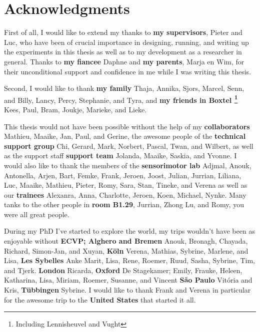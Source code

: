 \clearpage
\pagestyle{empty}

\chapter*{Acknowledgments}
{}

First of all, I would like to extend my thanks to \textbf{my supervisors}, Pieter and Luc, who have been of crucial importance in designing, running, and writing up the experiments in this thesis as well as to my development as a researcher in general. Thanks to \textbf{my fiancee} Daphne and \textbf{my parents}, Marja en Wim, for their unconditional support and confidence in me while I was writing this thesis.

Second, I would like to thank \textbf{my family} Thaja, Annika, Sjors, Marcel, Senn, and Billy, Lancy, Percy, Stephanie, and Tyra, and \textbf{my friends in Boxtel \footnote{Including Lennisheuvel and Vught}} Kees, Paul, Bram, Joukje, Marieke, and Lieke.


This thesis would not have been possible without the help of 
my \textbf{collaborators} Mathieu, Maaike, Jan, Paul, and Gerine,
the awesome people of the
\textbf{technical support group} Chi, Gerard, Mark, Norbert, Pascal, Twan, and Wilbert,
as well as the support staff
\textbf{support team} Jolanda, Maaike, Saskia, and Yvonne.
I would also like to thank the members of the 
\textbf{sensorimotor lab} Adjmal, Anouk, Antonella, Arjen, Bart, Femke, Frank, Jeroen, Joost, Julian, Jurrian, Liliana, Luc, Maaike, Mathieu, Pieter, Romy, Sara, Stan, Tineke, and Verena 
as well as our 
\textbf{trainees} Alexanra, Anna, Charlotte, Jeroen, Koen, Michael, Nynke.
Many tanks to the other people in \textbf{room B1.29}, Jurrian, Zhong Lu, and Romy, you were all great people.


During my PhD I've started to explore the world, my trips wouldn't have been as enjoyable without 
\textbf{ECVP; Alghero and Bremen} Anouk, Bronagh, Chayada, Richard, Simon-Jan, and Xuyan,
\textbf{K\"oln} Verena, Mathias, Sybrine, Marlene, and Lisa,
\textbf{Les Sybelles} Anke Marit, Lisa, Rene, Roemer, Ruud, Sasha, Sybrine, Tim, and Tjerk.
\textbf{London} Ricarda,
\textbf{Oxford} De Stagekamer; Emily, Frauke, Heleen, Katharina, Lisa, Miriam, Roemer, Susanne, and Vincent
\textbf{S\~ao Paulo} Vit\'oria and Kris,
\textbf{T\"ubbingen} Sybrine.
I would like to thank Frank and Verena in particular for the awesome trip to the \textbf{United States} that started it all.


